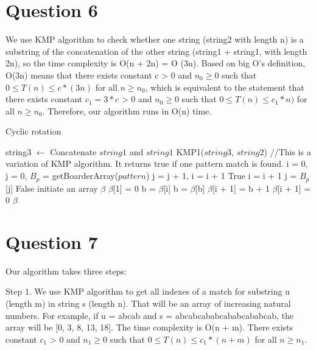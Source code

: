 \documentclass[11pt]{article}
\begin{document}
\section{Question 6}
We use KMP algorithm to check whether one string (string2 with length n) is a substring of the concatenation of the other string (string1 + string1, with length 2n), so the time complexity is O(n + 2n) = O (3n).
Based on big O's definition, O(3n) means that there exists constant c > 0 and $n_0 \ge 0 $ such that $ 0 \le T(n) \le c * (3n) $ for all $n \ge n_0$, which is equivalent to the statement that there exists constant $c_1 = 3*c$ > 0 and $n_0 \ge 0 $ such that $ 0 \le T(n) \le c_1 *n) $ for all $n \ge n_0$. Therefore, our algorithm runs in O(n) time.
\begin{algorithm}
\caption{Cyclic rotation}
\begin{algorithmic}[1]
\State string3 $\gets$ Concatenate $string1$ and $string1$
\State \Return KMP1($string3$, $string2$)
\EndProcedure
{}
\State //This is a variation of KMP algorithm. It returns true if one pattern match is found.
\State i = 0, j = 0, $B_p$ = getBoarderArray($pattern$)
		\State j = j + 1, i = i + 1
	\EndIf
		\Return True
	\Else
			\State i = i + 1
		\Else
			\State j = $B_p$[j]
		\EndIf
	\EndIf
\EndWhile
\Return False
\EndProcedure
{}
\State initiate an array $\beta$
\State $\beta$[1] = 0
	\State b = $\beta$[i]
		b = $\beta$[b]
	\EndWhile 
		\State  $\beta$[i + 1] = b + 1
	\Else
		\State$\beta$[i + 1] = 0
	\EndIf
\EndFor
\Return $\beta$
\EndProcedure
\end{algorithmic}
\end{algorithm}

\newpage

\section{Question 7}
Our algorithm takes three steps:

Step 1. We use KMP algorithm to get all indexes of a match for substring u (length m) in string s (length n). That will be an array of increasing natural numbers.
For example, if u = abcab and s = abcabcababcababcababcab, the array will be [0, 3, 8, 13, 18]. The time complexity is O(n + m). There exists constant $c_1$ > 0 and $n_1 \ge 0 $ such that $ 0 \le T(n) \le c_1 * (n + m) $ for all $n \ge n_1$.
\end{document}
